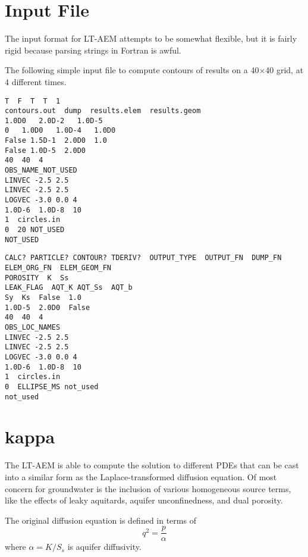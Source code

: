 \documentclass{article}
\begin{document}
\section{Input File}
\label{sec:input}
The input format for LT-AEM attempts to be somewhat flexible,  but it is fairly rigid because parsing strings in Fortran is awful.  

The following simple input file to compute contours of results on a 40$\times$40
grid, at 4 different times.

\begin{verbatim}
T  F  T  T  1  
contours.out  dump  results.elem  results.geom  
1.0D0   2.0D-2   1.0D-5   
0   1.0D0   1.0D-4   1.0D0   
False 1.5D-1  2.0D0  1.0  
False 1.0D-5  2.0D0    
40  40  4  
OBS_NAME_NOT_USED  
LINVEC -2.5 2.5 
LINVEC -2.5 2.5 
LOGVEC -3.0 0.0 4
1.0D-6  1.0D-8  10  
1  circles.in   
0  20 NOT_USED  
NOT_USED  
\end{verbatim}

\begin{verbatim}
CALC? PARTICLE? CONTOUR? TDERIV?  OUTPUT_TYPE  OUTPUT_FN  DUMP_FN  ELEM_ORG_FN  ELEM_GEOM_FN  
POROSITY  K  Ss   
LEAK_FLAG  AQT_K AQT_Ss  AQT_b  
Sy  Ks  False  1.0  
1.0D-5  2.0D0  False  
40  40  4  
OBS_LOC_NAMES
LINVEC -2.5 2.5 
LINVEC -2.5 2.5 
LOGVEC -3.0 0.0 4
1.0D-6  1.0D-8  10  
1  circles.in   
0  ELLIPSE_MS not_used  
not_used  
\end{verbatim}


\section{kappa}
\label{sec:kappa}

The LT-AEM is able to compute the solution to different PDEs that can
be cast into a similar form as the Laplace-transformed diffusion
equation.  Of most concern for groundwater is the inclusion of various
homogeneous source terms, like the effects of leaky aquitards, aquifer
unconfinedness, and dual porosity.

The original diffusion equation is defined in terms of 
\begin{equation}
  \label{eq:1}
  q^2 = \frac{p}{\alpha}
\end{equation}
where $\alpha=K/S_s$ is aquifer diffusivity.  
\end{document}
